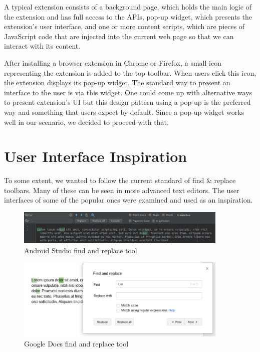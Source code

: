 \documentclass[bsc,frontabs,twoside,singlespacing,parskip,deptreport]{infthesis}
\begin{document}
A typical extension consists of a background page, which holds the main logic of the extension and has full access to the APIs, pop-up widget, which presents the extension's user interface, and one or more content scripts, which are pieces of JavaScript code that are injected into the current web page so that we can interact with its content.

After installing a browser extension in Chrome or Firefox, a small icon representing the extension is added to the top toolbar. When users click this icon, the extension displays its pop-up widget. The standard way to present an interface to the user is via this widget. One could come up with alternative ways to present extension's UI but this design pattern using a pop-up is the preferred way and something that users expect by default. Since a pop-up widget works well in our scenario, we decided to proceed with that.


\section{User Interface Inspiration}
To some extent, we wanted to follow the current standard of find \& replace toolbars. Many of these can be seen in more advanced text editors. The user interfaces of some of the popular ones were examined and used as an inspiration.

\begin{figure}[hp]
\centering
\includegraphics[width=0.9\textwidth]{../docs/editor-find-and-replace/android-studio-find-and-replace.png}
\caption{Android Studio find and replace tool}
\end{figure}

\begin{figure}[hp]
\centering
\includegraphics[width=0.9\textwidth]{../docs/editor-find-and-replace/gdocs-find-and-replace.png}
\caption{Google Docs find and replace tool}
\end{figure}
\end{document}
